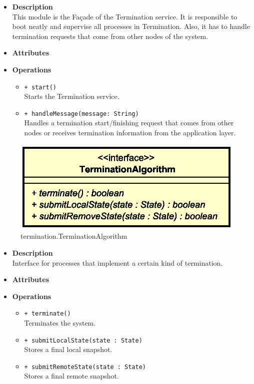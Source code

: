 \FloatBarrier
\begin{itemize}
  \item \textbf{Description} \\
    This module is the Fa\c cade of the Termination service. It is responsible
    to boot neatly and supervise all processes in Termination. Also, it has to
    handle termination requests that come from other nodes of the system.
  \item \textbf{Attributes}
  \item \textbf{Operations}
  \begin{itemize}
    \item \texttt{+ start()} \\
    Starts the Termination service.
    \item \texttt{+ handleMessage(message: String)} \\
    Handles a termination start/finishing request that comes from other nodes
    or receives termination information from the application layer.
  \end{itemize}
\end{itemize}


\begin{figure}[H]
  \centering
  \includegraphics[width=.5\columnwidth]{images/solution/mw/ter/talg.eps}
  \caption{termination.TerminationAlgorithm}
  \label{fig:mw-termination-term-alg}
\end{figure}

\FloatBarrier
\begin{itemize}
  \item \textbf{Description} \\
    Interface for processes that implement a certain kind of termination.
  \item \textbf{Attributes}
  \item \textbf{Operations}
  \begin{itemize}
    \item \texttt{+ terminate()} \\
    Terminates the system.
    \item \texttt{+ submitLocalState(state : State)} \\
    Stores a final local snapshot.
    \item \texttt{+ submitRemoteState(state : State)} \\
    Stores a final remote snapshot.
  \end{itemize}
\end{itemize}

